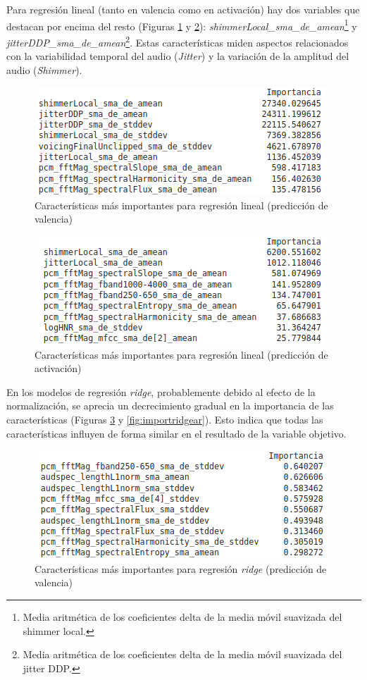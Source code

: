 \documentclass[12pt,a4paper]{article}
\begin{document}
Para regresión lineal (tanto en valencia como en activación) hay dos variables que destacan por encima del resto (Figuras \ref{fig:importlinearregval} y \ref{fig:importlinearregar}): \textit{shimmerLocal\_sma\_de\_amean}\footnote{Media aritmética de los coeficientes delta de la media móvil suavizada del shimmer local.} y \textit{jitterDDP\_sma\_de\_amean}\footnote{Media aritmética de los coeficientes delta de la media móvil suavizada del jitter DDP.}. Estas características miden aspectos relacionados con la variabilidad temporal del audio (\textit{Jitter}) y la variación de la amplitud del audio (\textit{Shimmer}).
\begin{figure}[H]
	\centering
	\includegraphics[width=0.7\linewidth]{figs/import_linear_reg_val}
	\caption{Características más importantes para regresión lineal (predicción de valencia)}
	\label{fig:importlinearregval}
\end{figure}
\begin{figure}[H]
	\centering
	\includegraphics[width=0.7\linewidth]{figs/import_linear_reg_ar}
	\caption{Características más importantes para regresión lineal (predicción de activación)}
	\label{fig:importlinearregar}
\end{figure}
En los modelos de regresión \textit{ridge}, probablemente debido al efecto de la normalización,  se aprecia un decrecimiento gradual en la importancia de las características (Figuras \ref{fig:importridgeval} y \ref{fig:importridgear}). Esto indica que todas las características influyen de forma similar en el resultado de la variable objetivo.
\begin{figure}[H]
	\centering
	\includegraphics[width=0.7\linewidth]{figs/import_ridge_val}
	\caption{Características más importantes para regresión \textit{ridge} (predicción de valencia)}
	\label{fig:importridgeval}
\end{figure}
\end{document}
